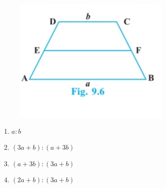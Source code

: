 \documentclass{article}
\begin{document}
\begin{enumerate}
\begin{figure}[!h]
\begin{center}
\includegraphics[width=\columnwidth]{six.jpg}
\end{center}
\caption{}
\label{fig: Figure 4}
\end{figure}
\begin{enumerate}
\item $a:b$ 
\item $(3a+b):(a+3b)$  
\item $(a+3b):(3a+b)$
\item $(2a+b):(3a+b)$
\end{enumerate}
\end{enumerate}
\end{document}
